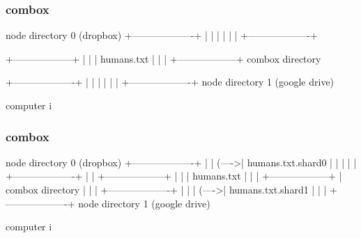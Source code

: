 \begin{frame}[fragile]
  \frametitle{combox}

  {\tiny
  \begin{semiverbatim}

         node directory 0
         (dropbox)
        +-------------------+
        |                   |
        |                   |
        |                   |
        +-------------------+


 +------------------+
 |                  |
 |  humans.txt      |
 |                  |
 +------------------+
     combox directory


        +-------------------+
        |                   |
        |                   |
        |                   |
        +-------------------+
         node directory 1
         (google drive)

  computer i
  \end{semiverbatim}
  }

\end{frame}


\begin{frame}[fragile]
  \frametitle{combox}

  {\tiny
  \begin{semiverbatim}

         node directory 0
         (dropbox)
        +-------------------+
        |                   |
  (---->| humans.txt.shard0 |
  |     |                   |
  |     +-------------------+
  |
  |
 +------------------+
 |                  |
 |  humans.txt      |
 |                  |
 +------------------+
  |  combox directory
  |
  |
  |     +-------------------+
  |     |                   |
  (---->| humans.txt.shard1 |
        |                   |
        +-------------------+
         node directory 1
         (google drive)

  computer i
  \end{semiverbatim}
  }

\end{frame}


